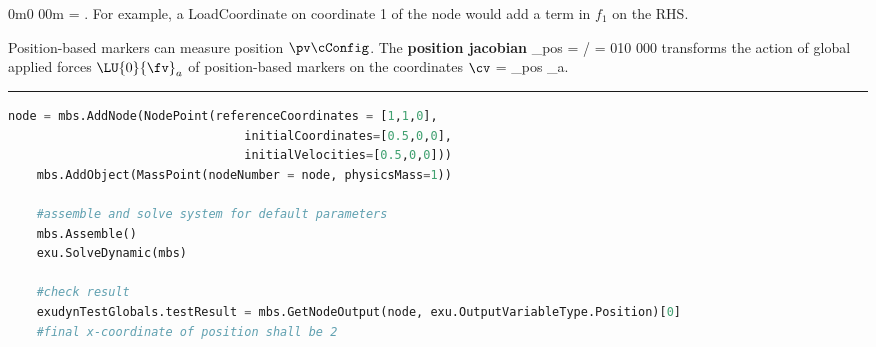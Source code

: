     \be 
       {0}{m}{0} {0}{0}{m}  = .
    \ee
    For example, a LoadCoordinate on coordinate 1 of the node would add a term in $f_1$ on the RHS.
    
    Position-based markers can measure position $\pv\cConfig$. The {\bf position jacobian}  
    \be
      \Jm_{pos} = \partial \pv\cCur / \partial \cv\cCur =  {0}{1}{0} {0}{0}{0}
    \ee
    transforms the action of global applied forces $\LU{0}{\fv}_a$ of position-based markers on the coordinates $\cv$
    \be
      \Qm = \Jm_{pos} _a.
    \ee
\vspace{6pt}\par\noindent\rule{\textwidth}{0.4pt}
\label{miniExample_ObjectMassPoint}
\pythonstyle
\begin{lstlisting}[language=Python, firstnumber=1]
    node = mbs.AddNode(NodePoint(referenceCoordinates = [1,1,0], 
                                 initialCoordinates=[0.5,0,0],
                                 initialVelocities=[0.5,0,0]))
    mbs.AddObject(MassPoint(nodeNumber = node, physicsMass=1))

    #assemble and solve system for default parameters
    mbs.Assemble()
    exu.SolveDynamic(mbs)

    #check result
    exudynTestGlobals.testResult = mbs.GetNodeOutput(node, exu.OutputVariableType.Position)[0]
    #final x-coordinate of position shall be 2

\end{lstlisting}

